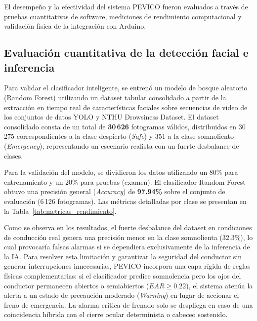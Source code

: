 \documentclass[conference]{IEEEtran}
\begin{document}
El desempeño y la efectividad del sistema PEVICO fueron evaluados a través de pruebas cuantitativas de software, mediciones de rendimiento computacional y validación física de la integración con Arduino.

\subsection{Evaluación cuantitativa de la detección facial e inferencia}

Para validar el clasificador inteligente, se entrenó un modelo de bosque aleatorio (Random Forest) utilizando un dataset tabular consolidado a partir de la extracción en tiempo real de características faciales sobre secuencias de video de los conjuntos de datos YOLO y NTHU Drowsiness Dataset. El dataset consolidado consta de un total de \textbf{30\,626} fotogramas válidos, distribuidos en 30\,275 correspondientes a la clase despierto (\textit{Safe}) y 351 a la clase somnoliento (\textit{Emergency}), representando un escenario realista con un fuerte desbalance de clases. 

Para la validación del modelo, se dividieron los datos utilizando un 80\% para entrenamiento y un 20\% para pruebas (examen). El clasificador Random Forest obtuvo una precisión general (\textit{Accuracy}) de \textbf{97.94\%} sobre el conjunto de evaluación (6\,126 fotogramas). Las métricas detalladas por clase se presentan en la Tabla~\ref{tab:metricas_rendimiento}.

\begin{table}[htbp]
\caption{Métricas de clasificación reales del modelo Random Forest}
\label{tab:metricas_rendimiento}
\centering
{}
\end{table}

Como se observa en los resultados, el fuerte desbalance del dataset en condiciones de conducción real genera una precisión menor en la clase somnolienta (32.3\%), lo cual provocaría falsas alarmas si se dependiera exclusivamente de la inferencia de la IA. Para resolver esta limitación y garantizar la seguridad del conductor sin generar interrupciones innecesarias, PEVICO incorpora una capa rígida de reglas físicas complementarias: si el clasificador predice somnolencia pero los ojos del conductor permanecen abiertos o semiabiertos ($EAR \ge 0.22$), el sistema atenúa la alerta a un estado de precaución moderado (\textit{Warning}) en lugar de accionar el freno de emergencia. La alarma crítica de frenado solo se despliega en caso de una coincidencia híbrida con el cierre ocular determinista o cabeceo sostenido.
\end{document}
